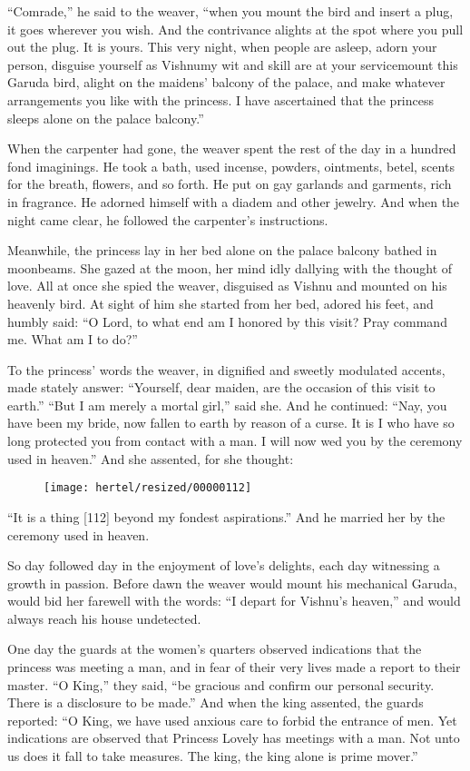 \documentclass[article, twoside, 10pt]{memoir}
\begin{document}
``Comrade,'' he said to the weaver,
``when you mount the bird and insert a plug, it goes wherever you wish. And the contrivance alights at the spot where you pull out the plug. It is yours. This very night, when people are asleep, adorn your person, disguise yourself as Vishnu{\textemdash}my wit and skill are at your service{\textemdash}mount this Garuda bird, alight on the maidens' balcony of the palace, and make whatever arrangements you like with the princess. I have ascertained that the princess sleeps alone on the palace balcony.''

When the carpenter had gone, the weaver spent the rest of the day
in a hundred fond imaginings. He took a bath, used incense,
powders, ointments, betel, scents for the breath, flowers, and so
forth. He put on gay garlands and garments, rich in fragrance. He
adorned himself with a diadem and other jewelry. And when the night
came clear, he followed the carpenter's instructions.

Meanwhile, the princess lay in her bed alone on the palace balcony
bathed in moonbeams. She gazed at the moon, her mind idly dallying
with the thought of love. All at once she spied the weaver,
disguised as Vishnu and mounted on his heavenly bird. At sight of
him she started from her bed, adored his feet, and humbly said:
``O Lord, to what end am I honored by this visit? Pray command me. What am I to do?''

To the princess' words the weaver, in dignified and sweetly
modulated accents, made stately answer:
``Yourself, dear maiden, are the occasion of this visit to earth.''
``But I am merely a mortal girl,'' said she. And he continued:
``Nay, you have been my bride, now fallen to earth by reason of a curse. It is I who have so long protected you from contact with a man. I will now wed you by the ceremony used in heaven.''
And she assented, for she thought:
\begin{figure}[p]\texttt{[image: hertel/resized/00000112]}\end{figure}``It is a thing [112] beyond my fondest aspirations.'' And he
married her by the ceremony used in heaven.

So day followed day in the enjoyment of love's delights, each day
witnessing a growth in passion. Before dawn the weaver would mount
his mechanical Garuda, would bid her farewell with the words:
``I depart for Vishnu's heaven,'' and would always reach his house
undetected.

One day the guards at the women's quarters observed indications
that the princess was meeting a man, and in fear of their very
lives made a report to their master. ``O King,'' they said,
``be gracious and confirm our personal security. There is a disclosure to be made.''
And when the king assented, the guards reported:
``O King, we have used anxious care to forbid the entrance of men. Yet indications are observed that Princess Lovely has meetings with a man. Not unto us does it fall to take measures. The king, the king alone is prime mover.''
\end{document}
